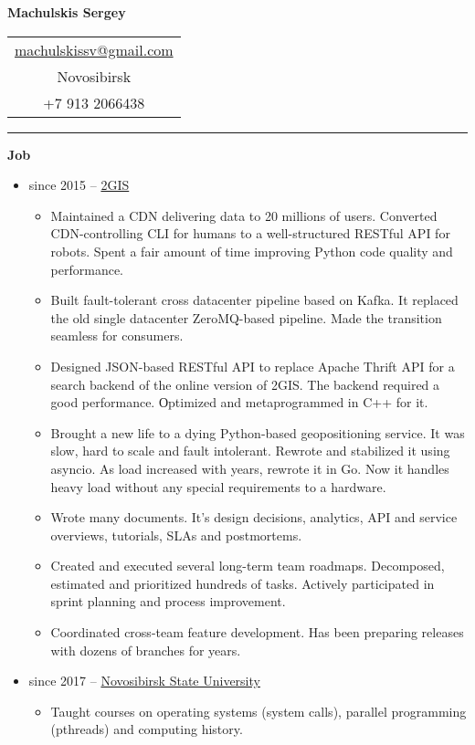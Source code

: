 \documentclass[final]{letter}
\begin{document}
\begin{center}

{\fontsize{25}{40}\selectfont\bf{Machulskis Sergey}}
  {\hfill
    \begin{tabular}{c}
        \href{mailto:machulskissv@gmail.com}{machulskissv@gmail.com}\\
        Novosibirsk \\
        +7 913 2066438\\
     \end{tabular}
  }
\rule{.98\textwidth}{1pt}

\addvspace{.1cm}

\end{center}

{\bf Job}
\begin{itemize}
  \item since 2015 -- \href{https://2gis.com}{2GIS}
  \begin{itemize}
  \item Maintained a CDN delivering data to 20 millions of users.
    Converted CDN-controlling CLI for humans to a well-structured RESTful API for robots.
    Spent a fair amount of time improving Python code quality and performance.
  \item Built fault-tolerant cross datacenter pipeline based on Kafka.
    It replaced the old single datacenter ZeroMQ-based pipeline. Made the transition seamless for consumers.
  \item Designed JSON-based RESTful API to replace Apache Thrift API for a search backend of the online version of 2GIS.
    The backend required a good performance. Оptimized and metaprogrammed in C++ for it.
  \item Brought a new life to a dying Python-based geopositioning service. It was slow, hard to scale and fault intolerant.
    Rewrote and stabilized it using asyncio. As load increased with years, rewrote it in Go. Now it handles heavy load without any special requirements to a hardware.
  \item Wrote many documents. It's design decisions, analytics, API and service overviews, tutorials, SLAs and postmortems.
  \item Created and executed several long-term team roadmaps. Decomposed, estimated and prioritized hundreds of tasks.
  Actively participated in sprint planning and process improvement.
  \item Coordinated cross-team feature development. Has been preparing releases with dozens of branches for years.
  \end{itemize}

  \item since 2017 -- \href{http://fit.nsu.ru/}{Novosibirsk State University}
    \begin{itemize}
      \item Taught courses on operating systems (system calls), parallel programming (pthreads) and computing history.
    \end{itemize}
  \end{itemize}
\end{document}

